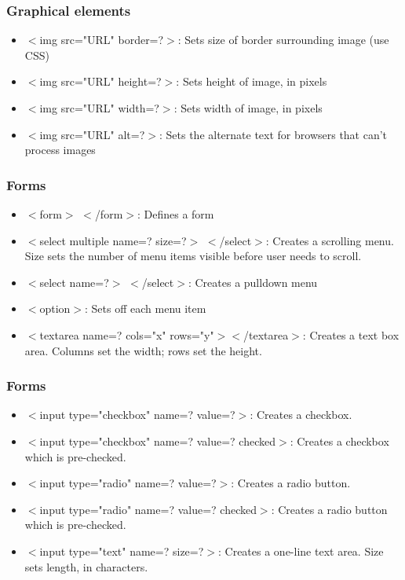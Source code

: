 \documentclass{beamer}
\begin{document}
\begin{frame}
\frametitle{Graphical elements}
\begin{itemize}
  \item  $<$img src="URL" border=?$>$:  Sets size of border surrounding image (use CSS)
  \item  $<$img src="URL" height=?$>$:  Sets height of image, in pixels
 \item   $<$img src="URL" width=?$>$:  Sets width of image, in pixels
  \item  $<$img src="URL" alt=?$>$:  Sets the alternate text for browsers that can't
 process images 
\end{itemize}
\end{frame}
\begin{frame}
\frametitle{Forms}
\begin{itemize}
  \item   $<$form$>$ $<$/form$>$:  Defines a form
 \item   $<$select multiple name=? size=?$>$ $<$/select$>$:  Creates a scrolling menu. Size sets the number of
 menu items visible before user needs to scroll.
 \item   $<$select name=?$>$ $<$/select$>$:  Creates a pulldown menu
 \item   $<$option$>$:  Sets off each menu item
 \item   $<$textarea name=? cols="x" rows="y"$>$$<$/textarea$>$:  Creates a text box area. Columns set the width;
 rows set the height.
\end{itemize}
\end{frame}
\begin{frame}
\frametitle{Forms}
\begin{itemize}
  \item   $<$input type="checkbox" name=? value=?$>$:  Creates a checkbox.
 \item   $<$input type="checkbox" name=? value=? checked$>$:  Creates a checkbox which is pre-checked.
 \item   $<$input type="radio" name=? value=?$>$:  Creates a radio button.
\item    $<$input type="radio" name=? value=? checked$>$:  Creates a radio button which is pre-checked.
 \item   $<$input type="text" name=? size=?$>$:  Creates a one-line text area.  Size sets length, in characters.
\end{itemize}
\end{frame}
\end{document}

